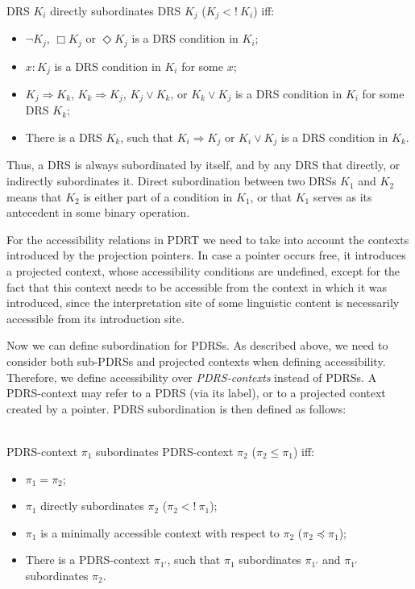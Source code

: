 \begin{subdefinition}~\\
DRS $K_i$ directly subordinates DRS $K_j$ ($K_j <!~K_i$) iff:
  \begin{itemize}
    \item $\neg K_j$, $\Box K_j$ or $\Diamond K_j$ is a DRS condition in
      $K_i$;
    \item $x:K_j$ is a DRS condition in $K_i$ for some $x$;
    \item $K_j \Rightarrow K_k$, $K_k \Rightarrow K_j$, $K_j \vee K_k$, or 
      $K_k \vee K_j$ is a DRS condition in $K_i$ for some DRS $K_k$;
    \item There is a DRS $K_k$, such that $K_i \Rightarrow K_j$ or $K_i \vee K_j$
      is a DRS condition in $K_k$.
  \end{itemize}
\end{subdefinition}

\noindent Thus, a DRS is always subordinated by itself, and by any DRS that
directly, or indirectly subordinates it. Direct subordination between two
DRSs $K_1$ and $K_2$ means that $K_2$ is either part of a condition in
$K_1$, or that $K_1$ serves as its antecedent in some binary operation.

For the accessibility relations in PDRT we need to take into
account the contexts introduced by the projection pointers.  In case
a pointer occurs free, it introduces a projected context, whose
accessibility conditions are undefined, except for the fact that this
context needs to be accessible from the context in which it was introduced,
since the interpretation site of some linguistic content is necessarily
accessible from its introduction site.

Now we can define subordination for PDRSs. As described above, we need to
consider both sub-PDRSs and projected contexts when defining accessibility.
Therefore, we define accessibility over \textit{PDRS-contexts} instead of
PDRSs. A PDRS-context may refer to a PDRS (via its label), or to a projected
context created by a pointer. PDRS subordination is then defined as follows:

\begin{definition}\label{def:PDRSsub}~\\
PDRS-context $\pi_1$ subordinates PDRS-context $\pi_2$ ($\pi_2 \leq \pi_1$)
iff:
\begin{itemize}
  \item $\pi_1 = \pi_2$;
  \item $\pi_1$ directly subordinates $\pi_2$ ($\pi_2 <!~\pi_1$);
  \item $\pi_1$ is a minimally accessible context with respect to $\pi_2$
    ($\pi_2 \preceq \pi_1$);    
  \item There is a PDRS-context $\pi_{1'}$, such that $\pi_1$ subordinates
    $\pi_{1'}$ and $\pi_{1'}$ subordinates $\pi_2$.
\end{itemize}
\end{definition}

